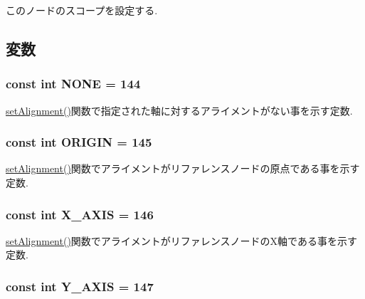 このノードのスコープを設定する. 

\subsection{変数}
\hypertarget{classm3g_1_1Node_7b20f1b443e093d5ec5e990e73b47232}{
\subsubsection[{NONE}]{\setlength{\rightskip}{0pt plus 5cm}const int {\bf NONE} = 144}}
\label{classm3g_1_1Node_7b20f1b443e093d5ec5e990e73b47232}


\hyperlink{classm3g_1_1Node_dd1627aba90e63c166ecd3d7463d735a}{setAlignment()}関数で指定された軸に対するアライメントがない事を示す定数. \hypertarget{classm3g_1_1Node_1b0d56eb173868ff472a6fd296c5bb6c}{
\subsubsection[{ORIGIN}]{\setlength{\rightskip}{0pt plus 5cm}const int {\bf ORIGIN} = 145}}
\label{classm3g_1_1Node_1b0d56eb173868ff472a6fd296c5bb6c}


\hyperlink{classm3g_1_1Node_dd1627aba90e63c166ecd3d7463d735a}{setAlignment()}関数でアライメントがリファレンスノードの原点である事を示す定数. \hypertarget{classm3g_1_1Node_dd4bccb7b9c652e726d58b06bd28dab2}{
\subsubsection[{X\_\-AXIS}]{\setlength{\rightskip}{0pt plus 5cm}const int {\bf X\_\-AXIS} = 146}}
\label{classm3g_1_1Node_dd4bccb7b9c652e726d58b06bd28dab2}


\hyperlink{classm3g_1_1Node_dd1627aba90e63c166ecd3d7463d735a}{setAlignment()}関数でアライメントがリファレンスノードのX軸である事を示す定数. \hypertarget{classm3g_1_1Node_3248ff73b5411ab0a66a38c451c8b6fe}{
\subsubsection[{Y\_\-AXIS}]{\setlength{\rightskip}{0pt plus 5cm}const int {\bf Y\_\-AXIS} = 147}}
\label{classm3g_1_1Node_3248ff73b5411ab0a66a38c451c8b6fe}


